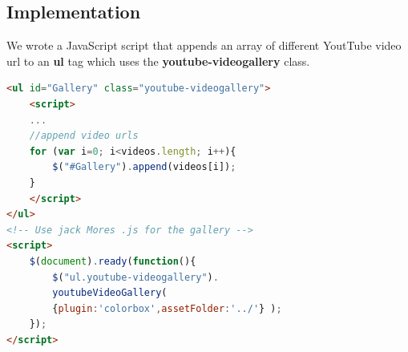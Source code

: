 \subsection{Implementation}
We wrote a JavaScript script that appends an array of different YoutTube video url to an \textbf{ul} tag which uses the \textbf{youtube-videogallery} class.   
\begin{lstlisting}[language=html, caption= 
extracts from the video gallery src]
<ul id="Gallery" class="youtube-videogallery">
	<script>
	... 
	//append video urls
	for (var i=0; i<videos.length; i++){
		$("#Gallery").append(videos[i]);
	}
	</script>
</ul>
<!-- Use jack Mores .js for the gallery -->
<script>
    $(document).ready(function(){
        $("ul.youtube-videogallery").
        youtubeVideoGallery( 
        {plugin:'colorbox',assetFolder:'../'} );
    });
</script> 
\end{lstlisting}
